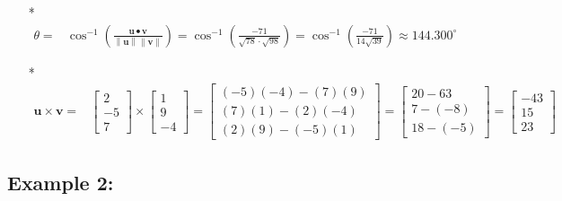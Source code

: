 \documentclass{article}
\begin{document}
\begin{itemize}
\item[*] \begin{align*}
\theta = & \cos^{-1}\left(\frac{\mathbf{u} \bullet \mathbf{v}}{\left\|\mathbf{u}\right\| \left\|\mathbf{v}\right\|}\right)  
= \cos^{-1}\left(\frac{-71}{\sqrt{78} \cdot \sqrt{98}}\right) 
= \cos^{-1}\left(\frac{-71}{14\sqrt{39}}\right)   
\approx 144.300^\circ
\end{align*}  
\item[*] \begin{align*}
\mathbf{u} \times \mathbf{v} = & \begin{bmatrix} 2 \\ -5 \\ 7 \end{bmatrix} \times \begin{bmatrix} 1 \\ 9 \\ -4 \end{bmatrix}  
= \begin{bmatrix} (-5)(-4) - (7)(9) \\ (7)(1) - (2)(-4) \\ (2)(9) - (-5)(1) \end{bmatrix} 
= \begin{bmatrix} 20 - 63 \\ 7 - (-8) \\ 18 - (-5) \end{bmatrix} 
= \begin{bmatrix} -43 \\ 15 \\ 23 \end{bmatrix}
\end{align*}
\end{itemize}


\subsection*{Example 2:}
\end{document}

